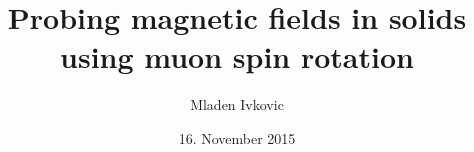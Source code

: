 




\title{Probing magnetic fields in solids using muon spin rotation}

\author[M. Ivkovic]{
	Mladen Ivkovic
}
\date[16.11.15]{16. November 2015}












% 
% 
% 
% 
% 


